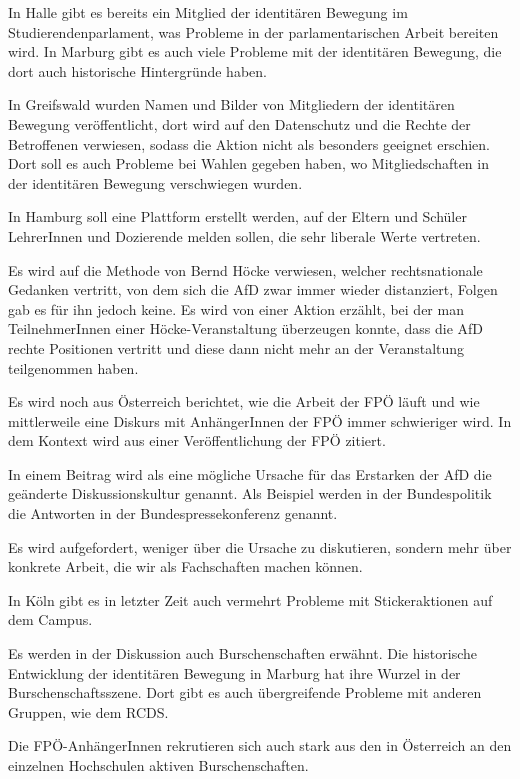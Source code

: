 In Halle gibt es bereits ein Mitglied der identitären Bewegung im Studierendenparlament, was Probleme in der parlamentarischen Arbeit bereiten wird. In Marburg gibt es auch viele Probleme mit der identitären Bewegung, die dort auch historische Hintergründe haben. 

In Greifswald wurden Namen und Bilder von Mitgliedern der identitären Bewegung veröffentlicht, dort wird auf den Datenschutz und die Rechte der Betroffenen verwiesen, sodass die Aktion nicht als besonders geeignet erschien. Dort soll es auch Probleme bei Wahlen gegeben haben, wo Mitgliedschaften in der identitären Bewegung verschwiegen wurden. 

In Hamburg soll eine Plattform erstellt werden, auf der Eltern und Schüler LehrerInnen und Dozierende melden sollen, die sehr liberale Werte vertreten.  

Es wird auf die Methode von Bernd Höcke verwiesen, welcher rechtsnationale Gedanken vertritt, von dem sich die AfD zwar immer wieder distanziert, Folgen gab es für ihn jedoch keine. Es wird von einer Aktion erzählt, bei der man TeilnehmerInnen einer Höcke-Veranstaltung überzeugen konnte, dass die AfD rechte Positionen vertritt und diese dann nicht mehr an der Veranstaltung teilgenommen haben. 

Es wird noch aus Österreich berichtet, wie die Arbeit der FPÖ läuft und wie mittlerweile eine Diskurs mit AnhängerInnen der FPÖ immer schwieriger wird. In dem Kontext wird aus einer Veröffentlichung der FPÖ zitiert. 

In einem Beitrag wird als eine mögliche Ursache für das Erstarken der AfD die geänderte Diskussionskultur genannt. Als Beispiel werden in der Bundespolitik die Antworten in der Bundespressekonferenz genannt. 

Es wird aufgefordert, weniger über die Ursache zu diskutieren, sondern mehr über konkrete Arbeit, die wir als Fachschaften machen können. 

In Köln gibt es in letzter Zeit auch vermehrt Probleme mit Stickeraktionen auf dem Campus. 

Es werden in der Diskussion auch Burschenschaften erwähnt. Die historische Entwicklung der identitären Bewegung in Marburg hat ihre Wurzel in der Burschenschaftsszene. Dort gibt es auch übergreifende Probleme mit anderen Gruppen, wie dem RCDS. 

Die FPÖ-AnhängerInnen rekrutieren sich auch stark aus den in Österreich an den einzelnen Hochschulen aktiven Burschenschaften. 


